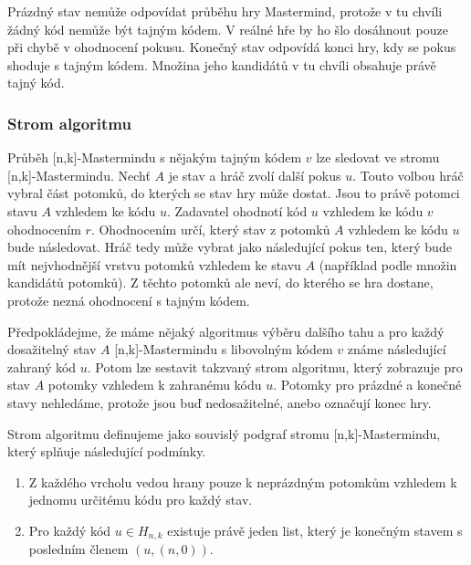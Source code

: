 Prázdný stav nemůže odpovídat průběhu hry Mastermind, protože v tu chvíli žádný kód nemůže být tajným kódem. V reálné hře by ho šlo dosáhnout pouze při chybě v ohodnocení pokusu. Konečný stav odpovídá konci hry, kdy se pokus shoduje s tajným kódem. Množina jeho kandidátů v tu chvíli obsahuje právě tajný kód. 

\subsubsection{Strom algoritmu}
Průběh [n,k]-Mastermindu s nějakým tajným kódem $v$ lze sledovat ve stromu [n,k]-Mastermindu. Nechť $A$ je stav a hráč zvolí další pokus $u$. Touto volbou hráč vybral část potomků, do kterých se stav hry může dostat. Jsou to právě potomci stavu $A$ vzhledem ke kódu $u$. Zadavatel ohodnotí kód $u$ vzhledem ke kódu $v$ ohodnocením $r$. Ohodnocením určí, který stav z potomků $A$ vzhledem ke kódu $u$ bude následovat. Hráč tedy může vybrat jako následující pokus ten, který bude mít nejvhodnější vrstvu potomků vzhledem ke stavu $A$ (například podle množin kandidátů potomků). Z těchto potomků ale neví, do kterého se hra dostane, protože nezná ohodnocení s tajným kódem. 

Předpokládejme, že máme nějaký algoritmus výběru dalšího tahu a pro každý dosažitelný stav $A$ [n,k]-Mastermindu s libovolným kódem $v$ známe následující zahraný kód $u$. Potom lze sestavit takzvaný strom algoritmu, který zobrazuje pro stav $A$ potomky vzhledem k zahranému kódu $u$. Potomky pro prázdné a konečné stavy nehledáme, protože jsou buď nedosažitelné, anebo označují konec hry. 

\begin{definice}
  Strom algoritmu definujeme jako souvislý podgraf stromu [n,k]-Mastermindu, který splňuje následující podmínky.
  \begin{enumerate}
      \item Z každého vrcholu vedou hrany pouze k neprázdným potomkům vzhledem k jednomu určitému kódu pro každý stav. 
      \item Pro každý kód $u \in H_{n,k}$ existuje právě jeden list, který je konečným stavem s posledním členem $(u, (n,0))$. 
  \end{enumerate}
\end{definice}


